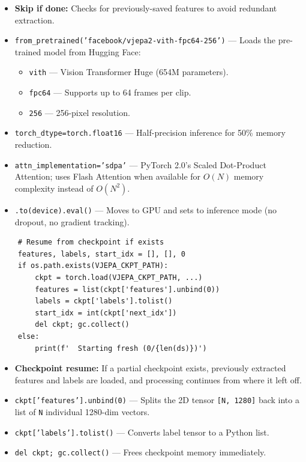 \begin{explanation}
\begin{itemize}[nosep]
  \item \textbf{Skip if done:} Checks for previously-saved features to avoid redundant extraction.
  \item \texttt{from\_pretrained('facebook/vjepa2-vith-fpc64-256')} --- Loads the pre-trained model from Hugging Face:
  \begin{itemize}[nosep]
    \item \texttt{vith} --- Vision Transformer Huge (654M parameters).
    \item \texttt{fpc64} --- Supports up to 64 frames per clip.
    \item \texttt{256} --- 256-pixel resolution.
  \end{itemize}
  \item \texttt{torch\_dtype=torch.float16} --- Half-precision inference for 50\% memory reduction.
  \item \texttt{attn\_implementation='sdpa'} --- PyTorch 2.0's Scaled Dot-Product Attention; uses Flash Attention when available for $O(N)$ memory complexity instead of $O(N^2)$.
  \item \texttt{.to(device).eval()} --- Moves to GPU and sets to inference mode (no dropout, no gradient tracking).
\end{itemize}
\end{explanation}

\begin{lstlisting}
    # Resume from checkpoint if exists
    features, labels, start_idx = [], [], 0
    if os.path.exists(VJEPA_CKPT_PATH):
        ckpt = torch.load(VJEPA_CKPT_PATH, ...)
        features = list(ckpt['features'].unbind(0))
        labels = ckpt['labels'].tolist()
        start_idx = int(ckpt['next_idx'])
        del ckpt; gc.collect()
    else:
        print(f'  Starting fresh (0/{len(ds)})')
\end{lstlisting}

\begin{explanation}
\begin{itemize}[nosep]
  \item \textbf{Checkpoint resume:} If a partial checkpoint exists, previously extracted features and labels are loaded, and processing continues from where it left off.
  \item \texttt{ckpt['features'].unbind(0)} --- Splits the 2D tensor \texttt{[N, 1280]} back into a list of \texttt{N} individual 1280-dim vectors.
  \item \texttt{ckpt['labels'].tolist()} --- Converts label tensor to a Python list.
  \item \texttt{del ckpt; gc.collect()} --- Frees checkpoint memory immediately.
\end{itemize}
\end{explanation}

